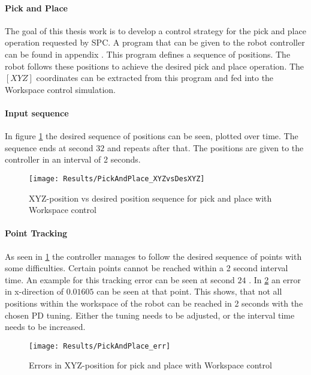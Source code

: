 
\paragraph{Pick and Place}
The goal of this thesis work is to develop a control strategy for the pick and place operation requested by SPC. A program that can be given to the robot controller can be found in appendix .
This program defines a sequence of positions. The robot follows these positions to achieve the desired pick and place operation.
The $ [XYZ] $ coordinates can be extracted from this program and fed into the Workspace control simulation.

\paragraph{Input sequence}
In figure \ref{fig:PickAndPlace_XYZvsDesXYZ} the desired sequence of positions can be seen, plotted over time. The sequence ends at second $32$ and repeats after that. The positions are given to the controller in an interval of 2 seconds.

\begin{figure}[H]
	\texttt{[image: Results/PickAndPlace\_XYZvsDesXYZ]}
	\caption{XYZ-position vs desired position sequence for pick and place with Workspace control}
	\label{fig:PickAndPlace_XYZvsDesXYZ}
\end{figure}


\paragraph{Point Tracking}
As seen in \cref{fig:PickAndPlace_XYZvsDesXYZ} the controller manages to follow the desired sequence of points with some difficulties. Certain points cannot be reached within a 2 second interval time. An example for this tracking error can be seen at second $24$ . In \cref{fig:PickAndPlace_err} an error in x-direction of $0.01605$ can be seen at that point. 
This shows, that not all positions within the workspace of the robot can be reached in 2 seconds with the chosen PD tuning.
Either the tuning needs to be adjusted, or the interval time needs to be increased.

\begin{figure}[H]
	\texttt{[image: Results/PickAndPlace\_err]}
	\caption{Errors in XYZ-position for pick and place with Workspace control}
	\label{fig:PickAndPlace_err}
\end{figure}



